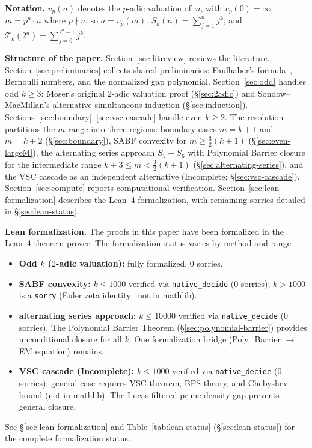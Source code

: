 \documentclass[12pt,a4paper]{article}
\theoremstyle{plain}
\theoremstyle{definition}
\newcommand{\Tk}{\mathcal{T}_{k}}
\begin{document}
\medskip
\noindent\textbf{Notation.}
$v_p(n)$ denotes the $p$-adic valuation of~$n$, with $v_p(0) = \infty$.
$m = p^a \cdot u$ where $p \nmid u$, so $a = v_p(m)$.
$S_k(n) = \sum_{j=1}^{n} j^k$, and $\Tk(2^a) = \sum_{j=0}^{2^a-1} j^k$.

\medskip
\noindent\textbf{Structure of the paper.}
Section~\ref{sec:litreview} reviews the literature.
Section~\ref{sec:preliminaries} collects shared preliminaries: Faulhaber's
formula~\cite{Faulhaber,Bernoulli}, Bernoulli numbers, and the normalized
gap polynomial.
Section~\ref{sec:odd} handles odd $k \ge 3$: Moser's original $2$-adic valuation proof (\S\ref{sec:2adic}) and Sondow--MacMillan's alternative simultaneous induction (\S\ref{sec:induction}).
Sections~\ref{sec:boundary}--\ref{sec:vsc-cascade} handle even $k \ge 2$.
The resolution partitions the $m$-range into three regions:
boundary cases $m=k+1$ and $m=k+2$ (\S\ref{sec:boundary}), SABF convexity
for $m \ge \frac{3}{2}(k+1)$ (\S\ref{sec:even-largeM}), the alternating series
approach $S_5+S_6$ with Polynomial Barrier closure for the intermediate range
$k+3 \le m < \frac{3}{2}(k+1)$ (\S\ref{sec:alternating-series}),
and the VSC cascade as an independent alternative (Incomplete; \S\ref{sec:vsc-cascade}).
Section~\ref{sec:compute} reports computational verification.
Section~\ref{sec:lean-formalization} describes the Lean~4 formalization,
with remaining sorries detailed in \S\ref{sec:lean-status}.

\medskip
\noindent\textbf{Lean formalization.}
The proofs in this paper have been formalized in the Lean~4 theorem prover.
The formalization status varies by method and range:
\begin{itemize}[nosep]
  \item \textbf{Odd $k$ ($2$-adic valuation):} fully formalized, 0 sorries.
  \item \textbf{SABF convexity:} $k \le 1000$ verified via
    \texttt{native\_decide} (0 sorries); $k > 1000$ is a \texttt{sorry}
    (Euler zeta identity~\cite{Euler} not in mathlib).
  \item \textbf{alternating series approach:} $k \le 10000$
    verified via \texttt{native\_decide} (0 sorries).
    The Polynomial Barrier Theorem (\S\ref{sec:polynomial-barrier})
    provides unconditional closure for all $k$.
    One formalization bridge (Poly.~Barrier $\to$ EM equation) remains.
  \item \textbf{VSC cascade (Incomplete):} $k \le 1000$ verified via
    \texttt{native\_decide} (0 sorries); general case requires VSC theorem,
    BPS theory, and Chebyshev bound (not in mathlib).
    The Lucas-filtered prime density gap prevents general closure.
\end{itemize}
See \S\ref{sec:lean-formalization} and Table~\ref{tab:lean-status}
(\S\ref{sec:lean-status}) for the complete formalization status.
\end{document}
